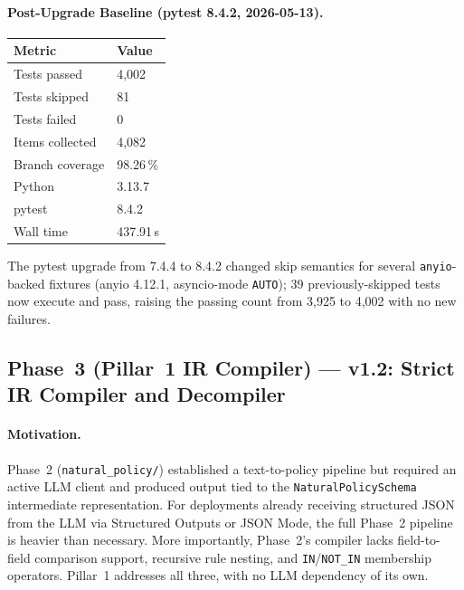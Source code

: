 \documentclass[12pt,a4paper,oneside]{report}
\newcommand{\fname}[1]{\texttt{#1}}          %
\newcommand{\code}[1]{\texttt{#1}}           %
\begin{document}
\paragraph{Post-Upgrade Baseline (pytest 8.4.2, 2026-05-13).}

\begin{center}
\begin{tabular}{ll}
\toprule
Metric & Value \\
\midrule
Tests passed & 4,002 \\
Tests skipped & 81 \\
Tests failed & 0 \\
Items collected & 4,082 \\
Branch coverage & 98.26\,\% \\
Python & 3.13.7 \\
pytest & 8.4.2 \\
Wall time & 437.91\,s \\
\bottomrule
\end{tabular}
\end{center}

The pytest upgrade from 7.4.4 to 8.4.2 changed skip semantics for several
\code{anyio}-backed fixtures (anyio 4.12.1, asyncio-mode \texttt{AUTO});
39 previously-skipped tests now execute and pass, raising the passing count
from 3,925 to 4,002 with no new failures.

\subsection*{Phase~3 (Pillar~1 IR Compiler) --- v1.2: Strict IR Compiler and Decompiler}

\paragraph{Motivation.}
Phase~2 (\fname{natural\_policy/}) established a text-to-policy pipeline but
required an active LLM client and produced output tied to the
\code{NaturalPolicySchema} intermediate representation.  For deployments
already receiving structured JSON from the LLM via Structured Outputs or
JSON Mode, the full Phase~2 pipeline is heavier than necessary.  More
importantly, Phase~2's compiler lacks field-to-field comparison support,
recursive rule nesting, and \code{IN}/\code{NOT\_IN} membership operators.
Pillar~1 addresses all three, with no LLM dependency of its own.
\end{document}
